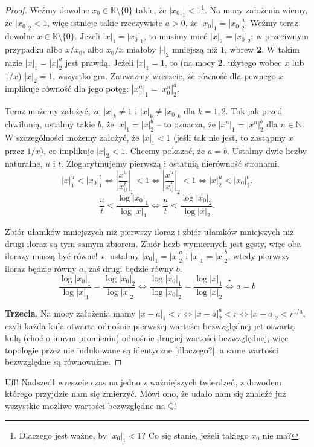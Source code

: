 \documentclass[a4paper,fleqn]{article}
\begin{document}
\begin{multicols}{2}
\begin{proof}
Weźmy dowolne $x_0\in\mathbb K\setminus\{0\}$ takie, że $|x_0|_1 < 1$\footnote{Dlaczego jest ważne, by $|x_0|_1 < 1$? Co się stanie, jeżeli takiego $x_0$ nie ma?}. Na mocy założenia wiemy, że $|x_0|_2 < 1$, więc istnieje takie rzeczywiste $a > 0$, że $|x_0|_1 = |x_0|_2^a$. Weźmy teraz dowolne $x\in\mathbb K\setminus\{0\}$. Jeżeli $|x|_1 = |x_0|_1$, to musimy mieć $|x|_2 = |x_0|_2$: w przeciwnym przypadku albo $x/x_0$, albo $x_0/x$ miałoby $|\cdot|_2$ mniejszą niż $1$, wbrew \textbf{2}. W takim razie $|x|_1 = |x|_2^a$ jest prawdą. Jeżeli $|x|_1 = 1$, to (na mocy \textbf{2}. użytego wobec $x$ lub $1/x$) $|x|_2 = 1$, wszystko gra. Zauważmy wreszcie, że równość dla pewnego $x$ implikuje równość dla jego potęg: $|x_0^n|_1 = |x_0^n|_2^a$.

Teraz możemy założyć, że $|x|_k \neq 1$ i $|x|_k \neq |x_0|_k$ dla $k = 1,2$. Tak jak przed chwilunią, ustalmy takie $b$, że $|x|_1 = |x|_2^b$ -- to oznacza, że $|x^n|_1 = |x^n|_2^b$ dla $n\in\mathbb N$. W szczególności możemy założyć, że $|x|_1 < 1$ (jeśli tak nie jest, to zastąpmy $x$ przez $1/x$), co implikuje $|x|_2 < 1$. Chcemy pokazać, że $a = b$. Ustalmy dwie liczby naturalne, $u$ i $t$. Zlogarytmujemy pierwszą i ostatnią nierówność stronami. \[|x|_1^u < |x_0|_1^t \iff \left|\frac{x^u}{x_0^t}\right|_1 < 1 \iff \left|\frac{x^u}{x_0^t}\right|_2 < 1 \iff |x|_2^u < |x_0|_2^t.\]
\[\frac{u}{t} < \frac{\log |x_0|_1}{\log |x|_1} \iff \frac{u}{t} < \frac{\log |x_0|_2}{\log |x|_2}.\]

Zbiór ułamków mniejszych niż pierwszy iloraz i zbiór ułamków mniejszych niż drugi iloraz są tym samym zbiorem. Zbiór liczb wymiernych jest gęsty, więc oba ilorazy muszą być równe! $\star$: ustalmy $|x_0|_1 = |x|_2^a$ i $|x|_1 = |x|_2^b$, wtedy pierwszy iloraz będzie równy $a$, zaś drugi będzie równy $b$.
\[\frac{\log |x_0|_1}{\log |x|_1} = \frac{\log |x_0|_2}{\log |x|_2} \iff \frac{\log |x_0|_1}{\log |x_0|_2} = \frac{\log |x|_1}{\log |x|_2} \overset{\star}{\iff} a = b\]

\textbf{Trzecia}. Na mocy założenia mamy $|x-a|_1 < r \Leftrightarrow |x-a|_2^a < r \Leftrightarrow |x-a|_2 < r^{1/a}$,
czyli każda kula otwarta odnośnie pierwszej wartości bezwzględnej jet otwartą kulą (choć o innym promieniu) odnośnie drugiej wartości bezwzględnej, więc topologie przez nie indukowane są identyczne [dlaczego?], a same wartości bezwzględne są równoważne.\end{proof}

Uff! Nadszedł wreszcie czas na jedno z ważniejszych twierdzeń, z dowodem którego przyjdzie nam się zmierzyć. Mówi ono, że udało nam się znaleźć już wszystkie możliwe wartości bezwzględne na $\mathbb Q$!


\end{multicols}
\end{document}
